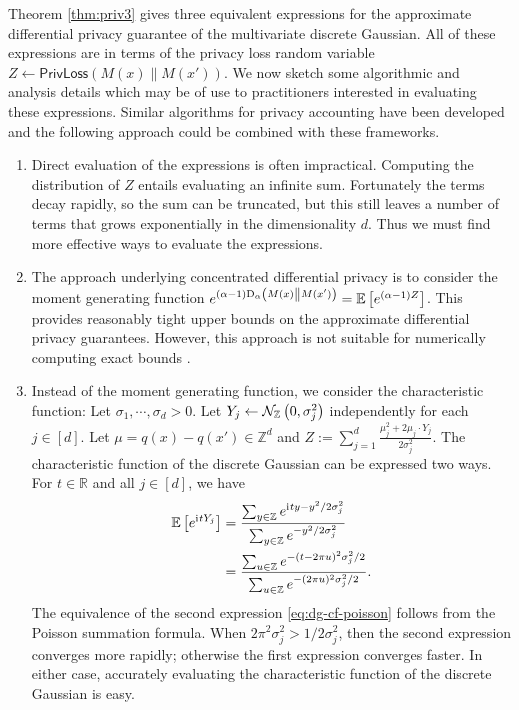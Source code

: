 \documentclass{jpc}
\newcommand{\ii}{\mathrm{i}\mkern1mu}
\newcommand{\dgausss}[2]{{\discN\left(#1,#2\right)}}
\newcommand{\dgauss}[1]{\dgausss{0}{#1}}
\newcommand{\ex}[2]{{\ifx&#1& \mathbb{E} \else
\underset{#1}{\mathbb{E}} \fi \left[#2\right]}}
\newcommand{\dr}[3]{\mathrm{D}_{#1}\left(#2\middle\|#3\right)}
\newcommand{\privloss}[2]{\mathsf{PrivLoss}\left(#1\middle\|#2\right)}
\newcommand{\Z}{\mathbb{Z}}
\newcommand{\R}{\mathbb{R}}
\begin{document}
Theorem \ref{thm:priv3} gives three equivalent expressions for the approximate differential privacy guarantee of the multivariate discrete Gaussian. All of these expressions are in terms of the privacy loss random variable $Z \gets \privloss{M(x)}{M(x')}$. We now sketch some algorithmic and analysis details which may be of use to practitioners interested in evaluating these expressions. Similar algorithms for privacy accounting have been developed \cite{KoskelaJPH20,GoogleComposition,ZhuDW21} and the following approach could be combined with these frameworks.
\begin{enumerate}
    \item Direct evaluation of the expressions is often impractical. Computing the distribution of $Z$ entails evaluating an infinite sum. Fortunately the terms decay rapidly, so the sum can be truncated, but this still leaves a number of terms that grows exponentially in the dimensionality $d$. Thus we must find more effective ways to evaluate the expressions.
    \item The approach underlying concentrated differential privacy is to consider the moment generating function $e^{(\alpha-1)\dr{\alpha}{M(x)}{M(x')}} = \ex{}{e^{(\alpha-1)Z}}$. This provides reasonably tight upper bounds on the approximate differential privacy guarantees. However, this approach is not suitable for numerically computing exact bounds \citep{McCullagh94}.
    \item Instead of the moment generating function, we consider the characteristic function: Let $\sigma_1, \cdots, \sigma_d >0$. Let $Y_j \gets \dgauss{\sigma_j^2}$ independently for each $j \in [d]$.
    Let $\mu = q(x)-q(x') \in \Z^d$ and $
    Z := \sum_{j=1}^d \frac{\mu_j^2 + 2 \mu_j \cdot Y_j}{2\sigma_j^2}.
    $
    The characteristic function of the discrete Gaussian can be expressed two ways. For $t \in \R$ and all $j \in [d]$, we have
    \begin{align}
        \ex{}{e^{\ii{}tY_j}} &= \frac{\sum_{y \in \Z} e^{\ii{}ty-y^2/2\sigma_j^2}}{\sum_{y \in \Z} e^{-y^2/2\sigma_j^2}}\label{eq:dg-cf}\\
        &= \frac{\sum_{u \in \Z} e^{-(t-2\pi u)^2\sigma_j^2/2}}{\sum_{u \in \Z} e^{-(2\pi u)^2\sigma_j^2/2}}.\label{eq:dg-cf-poisson}
    \end{align}
    The equivalence of the second expression \eqref{eq:dg-cf-poisson} follows from the Poisson summation formula. When $2\pi^2\sigma_j^2 > 1/2\sigma_j^2$, then the second expression converges more rapidly; otherwise the first expression converges faster. In either case, accurately evaluating the characteristic function of the discrete Gaussian is easy.
    

\end{enumerate}
\end{document}
